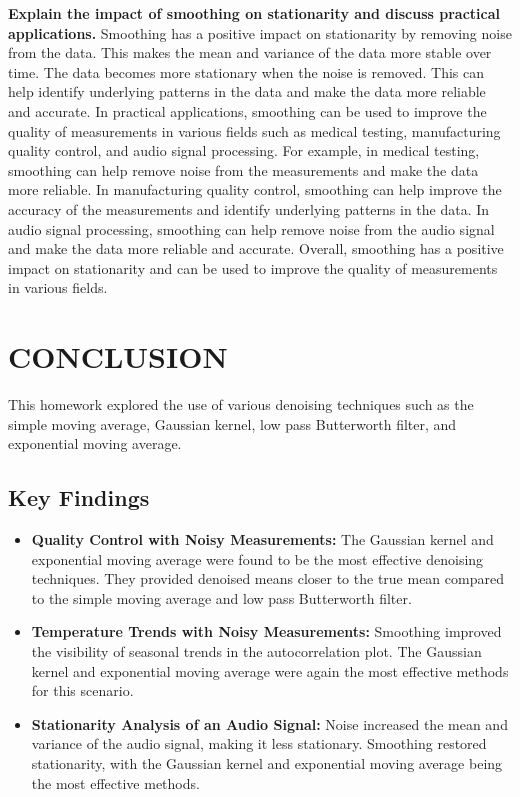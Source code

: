 \documentclass[a4paper,12pt]{article} %
\begin{document}
\newline\newline
\textbf{Explain the impact of smoothing on stationarity and discuss practical applications.}
Smoothing has a positive impact on stationarity by removing noise from the data. This makes the mean and variance of the data more stable over time. The data becomes more stationary when the noise is removed. This can help identify underlying patterns in the data and make the data more reliable and accurate. In practical applications, smoothing can be used to improve the quality of measurements in various fields such as medical testing, manufacturing quality control, and audio signal processing. For example, in medical testing, smoothing can help remove noise from the measurements and make the data more reliable. In manufacturing quality control, smoothing can help improve the accuracy of the measurements and identify underlying patterns in the data. In audio signal processing, smoothing can help remove noise from the audio signal and make the data more reliable and accurate. Overall, smoothing has a positive impact on stationarity and can be used to improve the quality of measurements in various fields.
\section{CONCLUSION}
This homework explored the use of various denoising techniques such as the simple moving average, Gaussian kernel, low pass Butterworth filter, and exponential moving average. 

\subsection*{Key Findings}
\begin{itemize}
    \item \textbf{Quality Control with Noisy Measurements:} The Gaussian kernel and exponential moving average were found to be the most effective denoising techniques. They provided denoised means closer to the true mean compared to the simple moving average and low pass Butterworth filter.
    \item \textbf{Temperature Trends with Noisy Measurements:} Smoothing improved the visibility of seasonal trends in the autocorrelation plot. The Gaussian kernel and exponential moving average were again the most effective methods for this scenario.
    \item \textbf{Stationarity Analysis of an Audio Signal:} Noise increased the mean and variance of the audio signal, making it less stationary. Smoothing restored stationarity, with the Gaussian kernel and exponential moving average being the most effective methods.
\end{itemize}
\end{document}
